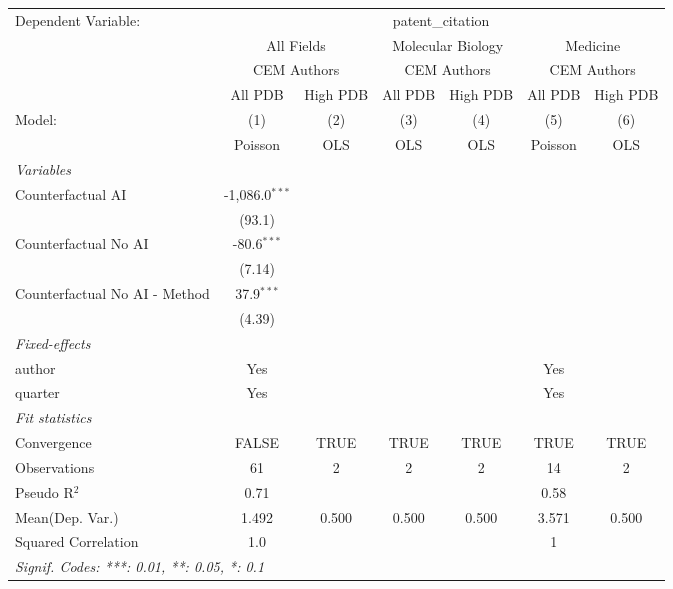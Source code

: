 \begingroup
\centering
\begin{tabular}{lcccccc}
   \tabularnewline \midrule \midrule
   Dependent Variable: & \multicolumn{6}{c}{patent\_citation}\\
 & \multicolumn{2}{c}{All Fields} & \multicolumn{2}{c}{Molecular Biology} & \multicolumn{2}{c}{Medicine} \\
\cmidrule(lr){2-3} \cmidrule(lr){4-5} \cmidrule(lr){6-7}
 & \multicolumn{2}{c}{CEM Authors} & \multicolumn{2}{c}{CEM Authors} & \multicolumn{2}{c}{CEM Authors} \\
\cmidrule(lr){2-3} \cmidrule(lr){4-5} \cmidrule(lr){6-7}
 & \multicolumn{1}{c}{All PDB} & \multicolumn{1}{c}{High PDB} & \multicolumn{1}{c}{All PDB} & \multicolumn{1}{c}{High PDB} & \multicolumn{1}{c}{All PDB} & \multicolumn{1}{c}{High PDB} \\
\cmidrule(lr){2-2} \cmidrule(lr){3-3} \cmidrule(lr){4-4} \cmidrule(lr){5-5} \cmidrule(lr){6-6} \cmidrule(lr){7-7}
   Model:                        & (1)              & (2)  & (3)  & (4)  & (5)     & (6)\\  
                                 &  Poisson         & OLS  & OLS  & OLS  & Poisson & OLS\\  
   \midrule
   \emph{Variables}\\
   Counterfactual AI             & -1,086.0$^{***}$ &      &      &      &         &   \\   
                                 & (93.1)           &      &      &      &         &   \\   
   Counterfactual No AI          & -80.6$^{***}$    &      &      &      &         &   \\   
                                 & (7.14)           &      &      &      &         &   \\   
   Counterfactual No AI - Method & 37.9$^{***}$     &      &      &      &         &   \\   
                                 & (4.39)           &      &      &      &         &   \\   
   \midrule
   \emph{Fixed-effects}\\
   author                        & Yes              &      &      &      & Yes     & \\  
   quarter                       & Yes              &      &      &      & Yes     & \\  
   \midrule
   \emph{Fit statistics}\\
   Convergence                   &FALSE             & TRUE & TRUE & TRUE & TRUE    & TRUE\\  
   Observations                  & 61               & 2    & 2    & 2    & 14      & 2\\  
   Pseudo R$^2$                  & 0.71             &      &      &      & 0.58    & \\  
Mean(Dep. Var.) & 1.492 & 0.500 & 0.500 & 0.500 & 3.571 & 0.500 \\
   Squared Correlation           & 1.0              &      &      &      & 1       & \\  
   \midrule \midrule
   \multicolumn{7}{l}{\emph{Signif. Codes: ***: 0.01, **: 0.05, *: 0.1}}\\
\end{tabular}
\par\endgroup
